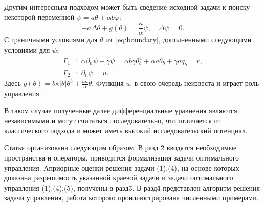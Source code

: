 Другим интересным подходом может быть сведение исходной задачи к поиску некоторой
переменной $\psi = a\theta + \alpha b \varphi$:
\begin{equation}
    \label{eq:equation}
    - a \Delta \theta + g (\theta) = \frac{\kappa}{\alpha}\psi, \quad
    \Delta \psi = 0.
\end{equation}
С граничными условиями для $\theta$ из~\eqref{eq:boundary}, дополненными следующими условиями для
$\psi$:
\begin{equation}
    \label{eq:boundary-2}
    \begin{aligned}
        \Gamma_1 &: \; \alpha \partial_n \psi + \gamma \psi = \alpha b \gamma \theta_b^4
        + \alpha a \theta_b + \gamma a q_b = r, \\
        \Gamma_2 &: \; \partial_n \psi = u.
    \end{aligned}
\end{equation}
Здесь $g(\theta) = b \kappa|\theta|\theta^3 + \frac{a\kappa}{\alpha}\theta$.
Функция $u$, в свою очередь неизвеста и играет роль управления.

В таком случае полученные далее дифференциальные уравнения являются независимыми и
могут считаться последовательно,
что отличается от классического подхода и может иметь высокий исследовательский потенциал.

Статья организована следующим образом.
В разд \. 2 вводятся необходимые пространства и операторы, приводится формализация задачи оптимального управления.
Априорные оценки решения задачи (1),(4), на основе которых доказана разрешимость
указанной краевой задачи и задачи оптимального управления (1),(4),(5), получены в разд\. 3.
В разд\. 4 представлен алгоритм решения задачи управления, работа которого
проиллюстрирована численными примерами.
